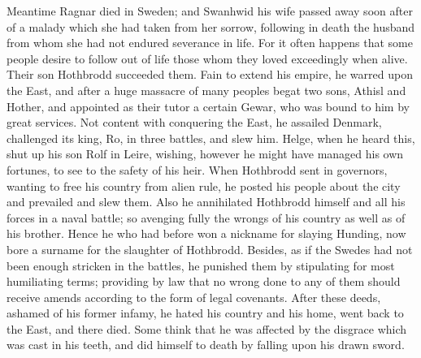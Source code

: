 \documentclass[10pt,a4paper]{report}
\begin{document}
Meantime Ragnar died in Sweden; and Swanhwid his wife passed away soon after of a malady which she had taken from her sorrow, following in death the husband from whom she had not endured severance in life. For it often happens that some people desire to follow out of life those whom they loved exceedingly when alive. Their son Hothbrodd succeeded them. Fain to extend his empire, he warred upon the East, and after a huge massacre of many peoples begat two sons, Athisl and Hother, and appointed as their tutor a certain Gewar, who was bound to him by great services. Not content with conquering the East, he assailed Denmark, challenged its king, Ro, in three battles, and slew him. Helge, when he heard this, shut up his son Rolf in Leire, wishing, however he might have managed his own fortunes, to see to the safety of his heir. When Hothbrodd sent in governors, wanting to free his country from alien rule, he posted his people about the city and prevailed and slew them. Also he annihilated Hothbrodd himself and all his forces in a naval battle; so avenging fully the wrongs of his country as well as of his brother. Hence he who had before won a nickname for slaying Hunding, now bore a surname for the slaughter of Hothbrodd. Besides, as if the Swedes had not been enough stricken in the battles, he punished them by stipulating for most humiliating terms; providing by law that no wrong done to any of them should receive amends according to the form of legal covenants. After these deeds, ashamed of his former infamy, he hated his country and his home, went back to the East, and there died. Some think that he was affected by the disgrace which was cast in his teeth, and did himself to death by falling upon his drawn sword.\\
\end{document}
